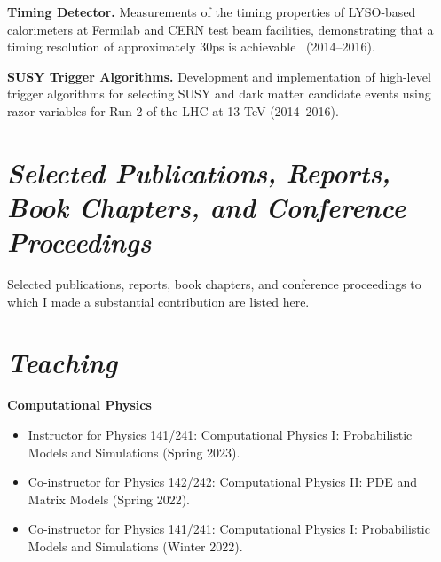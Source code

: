 \documentclass[11pt]{res}
\newcommand{\MarginText}[1]{\section{\textit{#1}}}
\begin{document}
\begin{resume}
{    \textbf{Timing Detector.} Measurements of the timing properties of LYSO-based calorimeters at Fermilab and CERN test beam facilities, demonstrating that a timing resolution of approximately 30\unit{ps} is achievable~\cite{Bornheim:2017gql,8069874,Anderson:2016tiu,Anderson:2016ygg,7581887,Anderson:2015gha,Anderson:2015tia,Bornheim_2015} ({2014--2016}).

    \textbf{SUSY Trigger Algorithms.} Development and implementation of high-level trigger algorithms for selecting SUSY and dark matter candidate events using razor variables for Run 2 of the LHC at 13 TeV  ({2014--2016}).

  }{}


  \MarginText{Selected Publications, Reports, Book Chapters, and Conference Proceedings}
  Selected publications, reports, book chapters, and conference proceedings to which I made a substantial contribution are listed here.\nocite{*}

  \vspace{11pt}
  \setlength\bibitemsep{\itemsep-0.3em}
  \printbibliography[heading=none,keyword={career}]


  \MarginText{Teaching}

  \textbf{Computational Physics}
  \begin{itemize}
    \itemsep-0.3em
    \item Instructor for Physics 141/241: Computational Physics I: Probabilistic Models and Simulations ({Spring 2023}).
    \item Co-instructor for Physics 142/242: Computational Physics II: PDE and Matrix Models ({Spring 2022}).
    \item Co-instructor for Physics 141/241: Computational Physics I: Probabilistic Models and Simulations ({Winter 2022}).
  \end{itemize}


\end{resume}
\end{document}
